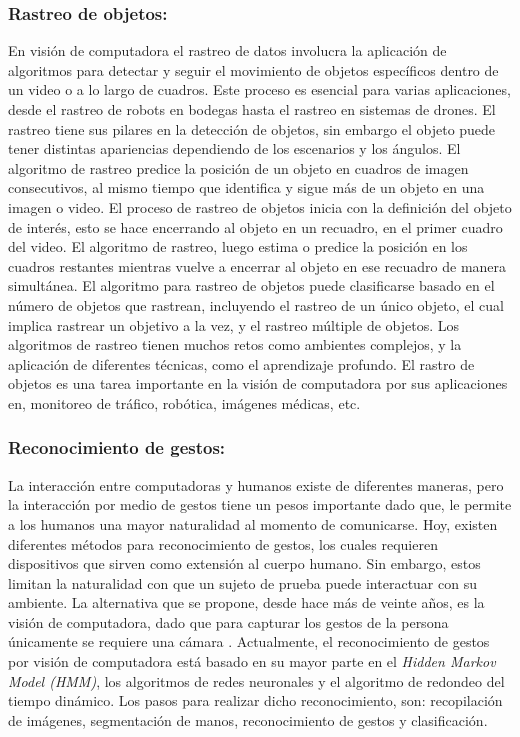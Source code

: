 \subsubsection*{Rastreo de objetos:}
En visión de computadora el rastreo de datos involucra la aplicación de algoritmos para detectar y seguir el movimiento de objetos específicos dentro de un video o a lo largo de cuadros. Este proceso es esencial para varias aplicaciones, desde el rastreo de robots en bodegas hasta el rastreo en sistemas de drones. El rastreo tiene sus pilares en la detección de objetos, sin embargo el objeto puede tener distintas apariencias dependiendo de los escenarios y los ángulos. El algoritmo de rastreo predice la posición de un objeto en cuadros de imagen consecutivos, al mismo tiempo que identifica y sigue más de un objeto en una imagen o video. El proceso de rastreo de objetos inicia con la definición del objeto de interés, esto se hace encerrando al objeto en un recuadro, en el primer cuadro del video. El algoritmo de rastreo, luego estima o predice la posición en los cuadros restantes mientras vuelve a encerrar al objeto en ese recuadro de manera simultánea. El algoritmo para rastreo de objetos puede clasificarse basado en el número de objetos que rastrean, incluyendo el rastreo de un único objeto, el cual implica rastrear un objetivo a la vez, y el rastreo múltiple de objetos. Los algoritmos de rastreo tienen muchos retos como ambientes complejos, y la aplicación de diferentes técnicas, como el aprendizaje profundo. El rastro de objetos es una tarea importante en la visión de computadora por sus aplicaciones en, monitoreo de tráfico, robótica, imágenes médicas, etc. \cite{Walia_2022} \cite{Acharya_2023} \cite{Barla_2021} \cite{Klingler_2023}


\subsubsection*{Reconocimiento de gestos:}

La interacción entre computadoras y humanos existe de diferentes maneras, pero la interacción por medio de gestos tiene un pesos importante dado que, le permite a los humanos una mayor naturalidad al momento de comunicarse. Hoy, existen diferentes métodos para reconocimiento de gestos, los cuales requieren dispositivos que sirven como extensión al cuerpo humano. Sin embargo, estos limitan la naturalidad con que un sujeto de prueba puede interactuar con su ambiente. La alternativa que se propone, desde hace más de veinte años, es la visión de computadora, dado que para capturar los gestos de la persona únicamente se requiere una cámara . Actualmente, el reconocimiento de gestos por visión de computadora está basado en su mayor parte en el \textit{Hidden Markov Model (HMM)}, los algoritmos de redes neuronales y el algoritmo de redondeo del tiempo dinámico. Los pasos para realizar dicho reconocimiento, son: recopilación de imágenes, segmentación de manos, reconocimiento de gestos y clasificación. \cite{Wang_Jang_2018}


